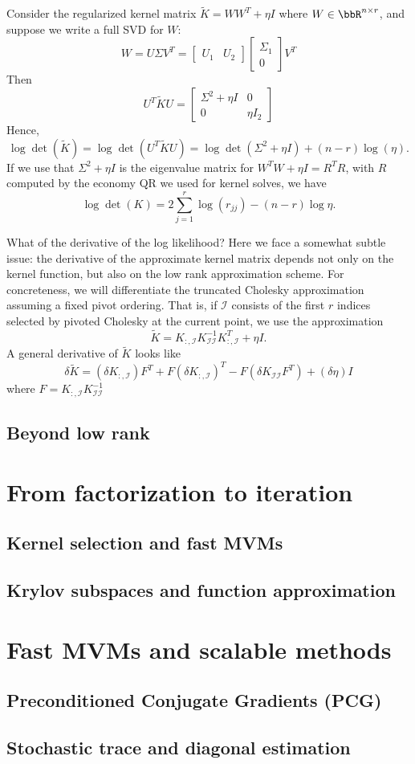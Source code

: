 \documentclass[12pt, leqno]{article} %
\newcommand{\calI}{\mathcal{I}}
\begin{document}
Consider the regularized kernel matrix $\tilde{K} = WW^T + \eta I$ where
$W \in \bbR^{n \times r}$, and suppose we write a full SVD for $W$:
\[
  W = U \Sigma V^T =
    \begin{bmatrix} U_1 & U_2 \end{bmatrix}
    \begin{bmatrix} \Sigma_1 \\ 0 \end{bmatrix}
    V^T
\]
Then
\[
  U^T \tilde{K} U = \begin{bmatrix} \Sigma^2 + \eta I & 0 \\ 0 & \eta I_2 \end{bmatrix}
\]
Hence,
\[
  \log \det(\tilde{K}) = \log \det(U^T \tilde{K} U) =
  \log \det(\Sigma^2 + \eta I) + (n-r) \log(\eta).
\]
If we use that $\Sigma^2 + \eta I$ is the eigenvalue matrix
for $W^T W + \eta I = R^T R$, with $R$ computed by the economy QR
we used for kernel solves, we have
\[
  \log \det(K) = 2 \sum_{j=1}^r \log(r_{jj}) - (n-r) \log \eta.
\]

What of the derivative of the log likelihood?  Here we face a somewhat
subtle issue: the derivative of the approximate kernel matrix depends
not only on the kernel function, but also on the low rank
approximation scheme.  For concreteness, we will differentiate the
truncated Cholesky approximation assuming a fixed pivot ordering.
That is, if $\mathcal{I}$ consists of the first $r$ indices selected by
pivoted Cholesky at the current point, we use the approximation
\[
  \tilde{K} = K_{:,\calI} K_{\calI \calI}^{-1} K_{:,\calI}^T + \eta I.
\]
A general derivative of $\tilde{K}$ looks like
\[
  \delta \tilde{K} =
    (\delta K_{:,\calI}) F^T + F (\delta K_{:,\calI})^T -
    F (\delta K_{\calI \calI} F^T) + (\delta \eta) I
\]
where $F = K_{:,\calI} K_{\calI \calI}^{-1}$

\subsection{Beyond low rank}

\section{From factorization to iteration}

\subsection{Kernel selection and fast MVMs}

\subsection{Krylov subspaces and function approximation}

\section{Fast MVMs and scalable methods}

\subsection{Preconditioned Conjugate Gradients (PCG)}

\subsection{Stochastic trace and diagonal estimation}
\end{document}
